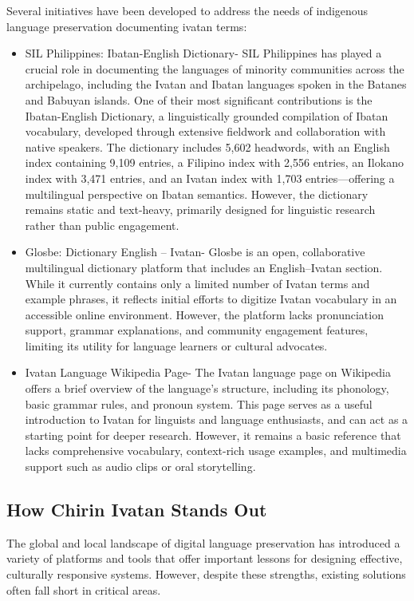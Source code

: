                 Several initiatives have been developed to address the needs of indigenous language preservation documenting ivatan terms:
                    \begin{itemize}
                        \item SIL Philippines: Ibatan-English Dictionary- SIL Philippines has played a crucial role in documenting the languages of minority communities across the archipelago, including the Ivatan and Ibatan languages spoken in the Batanes and Babuyan islands. One of their most significant contributions is the Ibatan-English Dictionary, a linguistically grounded compilation of Ibatan vocabulary, developed through extensive fieldwork and collaboration with native speakers. The dictionary includes 5,602 headwords, with an English index containing 9,109 entries, a Filipino index with 2,556 entries, an Ilokano index with 3,471 entries, and an Ivatan index with 1,703 entries—offering a multilingual perspective on Ibatan semantics. However, the dictionary remains static and text-heavy, primarily designed for linguistic research rather than public engagement. 
                        \item Glosbe: Dictionary English – Ivatan- Glosbe is an open, collaborative multilingual dictionary platform that includes an English–Ivatan section. While it currently contains only a limited number of Ivatan terms and example phrases, it reflects initial efforts to digitize Ivatan vocabulary in an accessible online environment. However, the platform lacks pronunciation support, grammar explanations, and community engagement features, limiting its utility for language learners or cultural advocates.
                        \item Ivatan Language Wikipedia Page- The Ivatan language page on Wikipedia offers a brief overview of the language’s structure, including its phonology, basic grammar rules, and pronoun system. This page serves as a useful introduction to Ivatan for linguists and language enthusiasts, and can act as a starting point for deeper research. However, it remains a basic reference that lacks comprehensive vocabulary, context-rich usage examples, and multimedia support such as audio clips or oral storytelling.
                    \end{itemize}

                \subsection {How Chirin Ivatan Stands Out}
                The global and local landscape of digital language preservation has introduced a variety of platforms and tools that offer important lessons for designing effective, culturally responsive systems. However, despite these strengths, existing solutions often fall short in critical areas. 

